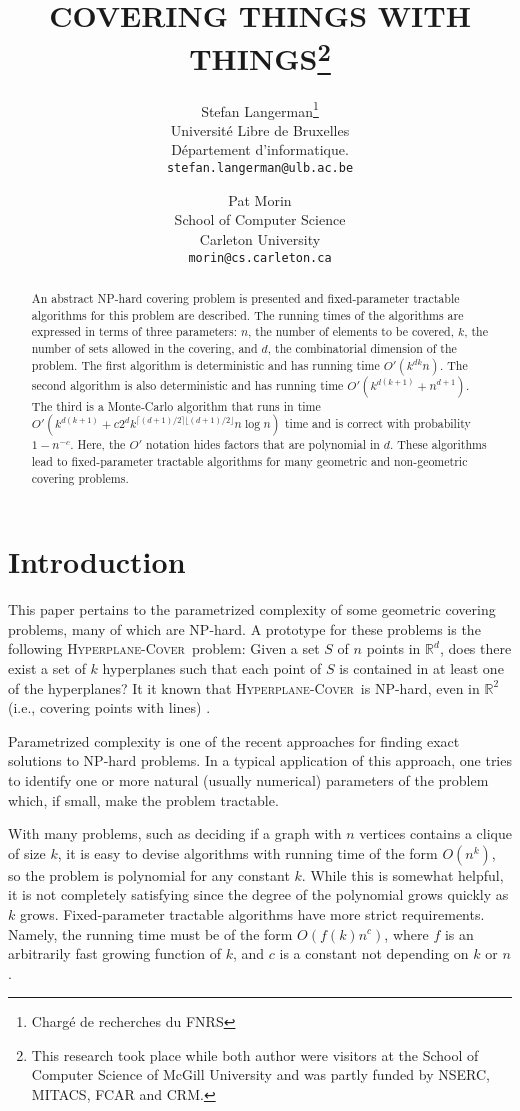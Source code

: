 \documentclass[ccfonts,lotsofwhite]{patmorin}
\title{\MakeUppercase{Covering Things with Things}\thanks{This
research took place while both author were visitors at the School of
Computer Science of McGill University and  was partly funded by NSERC,
MITACS, FCAR and CRM.}}
\author{Stefan Langerman\thanks{Charg\'e de recherches du FNRS} \\
	Universit\'e Libre de Bruxelles \\ 
	D\'epartement d'informatique. \\
	\texttt{stefan.langerman@ulb.ac.be}
\and Pat Morin \\
	School of Computer Science \\
	Carleton University \\
	\texttt{morin@cs.carleton.ca}}
\date{}
\newcommand{\hppc}{\textsc{Hyperplane-Cover}}
\newcommand{\exponent}{\lceil(d+1)/2\rceil\lfloor(d+1)/2\rfloor}
\newcommand{\runtime}{k^{d(k+1)}+c2^dk^{\exponent}n\log n}
\begin{document}
\begin{titlepage}
\maketitle

\begin{abstract}
An abstract NP-hard covering problem is presented and fixed-parameter
tractable algorithms for this problem are described.  The running
times of the algorithms are expressed in terms of three parameters:
$n$, the number of elements to be covered, $k$, the number of sets
allowed in the covering, and $d$, the combinatorial dimension of the
problem.  The first algorithm is deterministic and has running time
$O'(k^{dk}n)$.  The second algorithm is also deterministic and has
running time $O'(k^{d(k+1)}+n^{d+1})$.  The third is a Monte-Carlo
algorithm that runs in time $O'(\runtime)$ time and is correct with
probability $1-n^{-c}$.  Here, the $O'$ notation hides factors that
are polynomial in $d$.  These algorithms lead to fixed-parameter
tractable algorithms for many geometric and non-geometric covering
problems.
\end{abstract}
\thispagestyle{empty}
\end{titlepage}


\section{Introduction}

This paper pertains to the parametrized complexity of some geometric
covering problems, many of which are NP-hard. A prototype for these
problems is the following \hppc\ problem: Given a set $S$ of $n$
points in $\mathbb{R}^d$, does there exist a set of $k$ hyperplanes
such that each point of $S$ is contained in at least one of the
hyperplanes?  It it known that \hppc\ is NP-hard, even in
$\mathbb{R}^2$ (i.e., covering points with lines) \cite{mt82}.

Parametrized complexity \cite{df99} is one of the recent approaches
for finding exact solutions to NP-hard problems.  In a typical
application of this approach, one tries to identify one or more
natural (usually numerical) parameters of the problem which, if small,
make the problem tractable.

With many problems, such as deciding if a graph with $n$ vertices
contains a clique of size $k$, it is easy to devise algorithms with
running time of the form $O(n^k)$, so the problem is polynomial for
any constant $k$.  While this is somewhat helpful, it is not
completely satisfying since the degree of the polynomial grows quickly
as $k$ grows.  Fixed-parameter tractable algorithms have more strict
requirements.  Namely, the running time must be of the form
$O(f(k)n^c)$, where $f$ is an arbitrarily fast growing function of
$k$, and $c$ is a constant not depending on $k$ or $n$.
\end{document}

